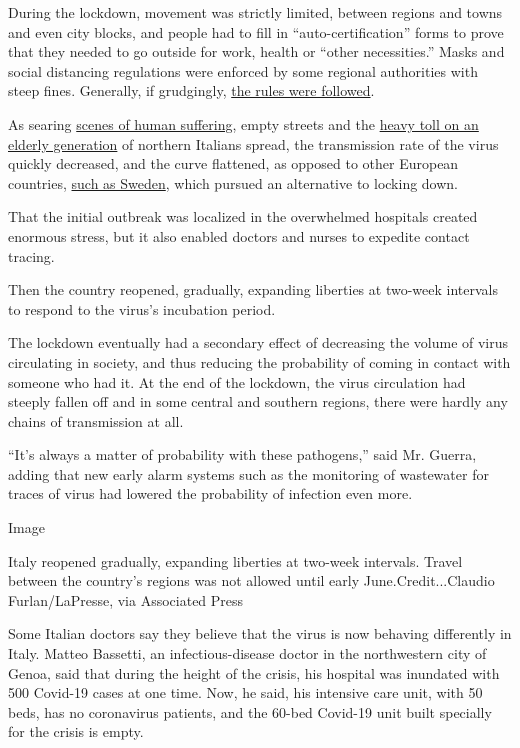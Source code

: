 During the lockdown, movement was strictly limited, between regions and
towns and even city blocks, and people had to fill in
``auto-certification'' forms to prove that they needed to go outside for
work, health or ``other necessities.'' Masks and social distancing
regulations were enforced by some regional authorities with steep fines.
Generally, if grudgingly,
\href{https://www.nytimes3xbfgragh.onion/2020/03/10/world/europe/italy-coronavirus-movement-restrictions.html}{the
rules were followed}.

As searing
\href{https://www.nytimes3xbfgragh.onion/2020/03/16/world/europe/italy-coronavirus-funerals.html}{scenes
of human suffering}, empty streets and the
\href{https://www.nytimes3xbfgragh.onion/2020/03/04/world/europe/coronavirus-italy-elderly.html}{heavy
toll on an elderly generation} of northern Italians spread, the
transmission rate of the virus quickly decreased, and the curve
flattened, as opposed to other European countries,
\href{https://www.nytimes3xbfgragh.onion/2020/07/07/business/sweden-economy-coronavirus.html}{such
as Sweden}, which pursued an alternative to locking down.

That the initial outbreak was localized in the overwhelmed hospitals
created enormous stress, but it also enabled doctors and nurses to
expedite contact tracing.

Then the country reopened, gradually, expanding liberties at two-week
intervals to respond to the virus's incubation period.

The lockdown eventually had a secondary effect of decreasing the volume
of virus circulating in society, and thus reducing the probability of
coming in contact with someone who had it. At the end of the lockdown,
the virus circulation had steeply fallen off and in some central and
southern regions, there were hardly any chains of transmission at all.

``It's always a matter of probability with these pathogens,'' said Mr.
Guerra, adding that new early alarm systems such as the monitoring of
wastewater for traces of virus had lowered the probability of infection
even more.

Image

Italy reopened gradually, expanding liberties at two-week intervals.
Travel between the country's regions was not allowed until early
June.Credit...Claudio Furlan/LaPresse, via Associated Press

Some Italian doctors say they believe that the virus is now behaving
differently in Italy. Matteo Bassetti, an infectious-disease doctor in
the northwestern city of Genoa, said that during the height of the
crisis, his hospital was inundated with 500 Covid-19 cases at one time.
Now, he said, his intensive care unit, with 50 beds, has no coronavirus
patients, and the 60-bed Covid-19 unit built specially for the crisis is
empty.

